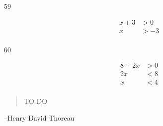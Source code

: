 \documentclass{exam}
\begin{document}
\begin{description}
    \item[59]
      \begin{align*}
        x + 3 & > 0 \\
        x     & > -3 \\
      \end{align*}

    \item[60]
      \begin{align*}
        8 - 2x & > 0 \\
        2x     & < 8 \\
        x      & < 4 \\
      \end{align*}

    \end{description}

  \else
    \vspace{6 cm}
    \begin{quote}
      \begin{em}
        TO DO
      \end{em}
    \end{quote}

    \hspace{1 cm} --Henry David Thoreau
  \fi
\end{document}
